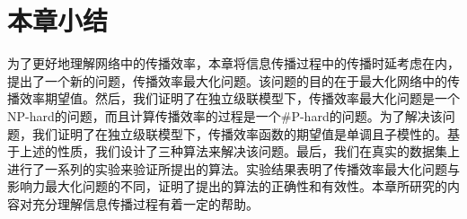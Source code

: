 \section{本章小结}
\label{3sec:conclusion}
为了更好地理解网络中的传播效率，本章将信息传播过程中的传播时延考虑在内，提出了一个新的问题，传播效率最大化问题。该问题的目的在于最大化网络中的传播效率期望值。然后，我们证明了在独立级联模型下，传播效率最大化问题是一个NP-hard的问题，而且计算传播效率的过程是一个\#P-hard的问题。为了解决该问题，我们证明了在独立级联模型下，传播效率函数的期望值是单调且子模性的。基于上述的性质，我们设计了三种算法来解决该问题。最后，我们在真实的数据集上进行了一系列的实验来验证所提出的算法。实验结果表明了传播效率最大化问题与影响力最大化问题的不同，证明了提出的算法的正确性和有效性。本章所研究的内容对充分理解信息传播过程有着一定的帮助。

